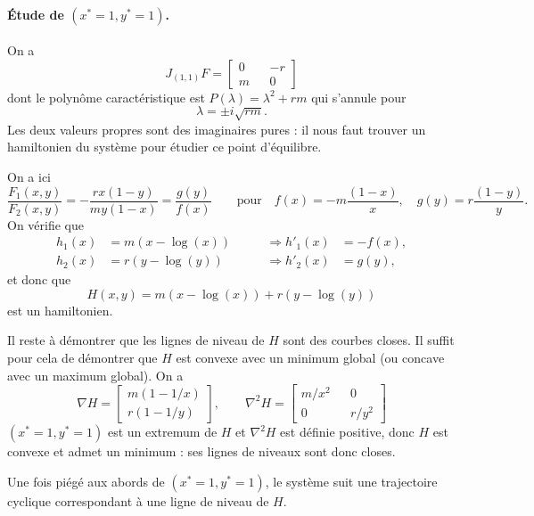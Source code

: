 \paragraph{\'Etude de $(x^* = 1, y^* = 1)$.}
On a 
$$
J_{(1, 1)}F = 
  \left[\begin{array}{ccc} 
    0 & & -r  \\
    m  & & 0
  \end{array}\right]
$$
dont le polynôme caractéristique est $P(\lambda) = \lambda^2 + rm$ qui s'annule pour
$$
\lambda = \pm i \sqrt{rm}.
$$
Les deux valeurs propres sont des imaginaires pures : il nous faut trouver un hamiltonien du système pour étudier ce point d'équilibre.

\bigskip
On a ici
$$
\frac{F_1(x, y)}{F_2(x, y)} = -\frac{rx(1-y)}{my(1-x)} = \frac{g(y)}{f(x)}
\qquad \text{pour} \quad
f(x) = -m \frac{(1-x)}{x}, \quad
g(y) = r \frac{(1-y)}{y}.
$$
On vérifie que
\begin{align*}
  h_1(x) & = m(x-\log(x)) & \qquad \Rightarrow h'_1(x) & = -f(x), \\
  h_2(x) & = r(y-\log(y)) & \qquad \Rightarrow h'_2(x) & = g(y),
\end{align*}
et donc que 
$$
H(x, y) = m(x-\log(x)) + r(y-\log(y))
$$
est un hamiltonien.

\bigskip
Il reste à démontrer que les lignes de niveau de $H$ sont des courbes closes. Il suffit pour cela de démontrer que $H$ est convexe avec un minimum global (ou concave avec un maximum global). On a
$$
\nabla H = \left[\begin{array}{c} m(1 - 1/x) \\ r(1 - 1/y)\end{array}\right], 
\qquad 
\nabla^2 H = \left[\begin{array}{ccc} m/x^2 & & 0 \\ 0 & & r/y^2 \end{array}\right] 
$$
$(x^* = 1, y^*=1)$ est un extremum de $H$ et $\nabla^2 H$ est définie positive, donc $H$ est convexe et admet un minimum : ses lignes de niveaux sont donc closes.

\bigskip
Une fois piégé aux abords de $(x^* = 1, y^*=1)$, le système suit une trajectoire cyclique 
correspondant à une ligne de niveau de $H$.



